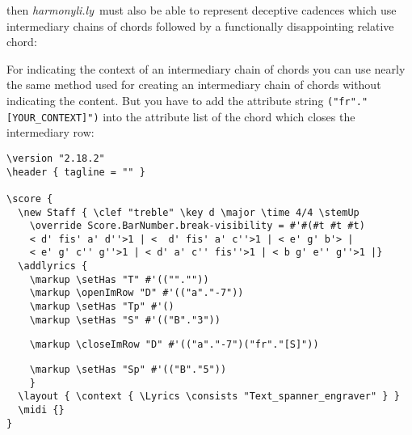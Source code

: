 \documentclass[
  DIV=calc,
  BCOR=5mm,
  12pt,
  headings=small,
  oneside,
  abstract=true,
  toc=bib,
  xcolor=dvipsnames,
  openany,
  ngerman,english]{scrartcl}
\newcommand{\hlyn}[0]{\textit{harmonyli.ly}}
\begin{document}
then \hlyn\  must also be able to represent deceptive cadences which use
intermediary chains of chords followed by a functionally disappointing relative
chord:

\begin{center}
\end{center}

For indicating the context of an intermediary chain of chords you can use nearly
the same method used for creating an intermediary chain of chords without
indicating the content. But you have to add the attribute string
\texttt{("fr"."[YOUR\_CONTEXT]")} into the attribute list of the chord which
closes the intermediary row:

\begin{scriptsize}
\begin{verbatim}
\version "2.18.2"
\header { tagline = "" }

\score {
  \new Staff { \clef "treble" \key d \major \time 4/4 \stemUp 
    \override Score.BarNumber.break-visibility = #'#(#t #t #t)
    < d' fis' a' d''>1 | <  d' fis' a' c''>1 | < e' g' b'> |
    < e' g' c'' g''>1 | < d' a' c'' fis''>1 | < b g' e'' g''>1 |}
  \addlyrics { 
    \markup \setHas "T" #'((""."")) 
    \markup \openImRow "D" #'(("a"."-7")) 
    \markup \setHas "Tp" #'() 
    \markup \setHas "S" #'(("B"."3"))     
\end{verbatim}
{ \color{red} \verb|    \markup \closeImRow "D" #'(("a"."-7")("fr"."[S]"))| }
\begin{verbatim} 
    \markup \setHas "Sp" #'(("B"."5"))
    }
  \layout { \context { \Lyrics \consists "Text_spanner_engraver" } }
  \midi {}
}
\end{verbatim}
\end{scriptsize}
\end{document}
